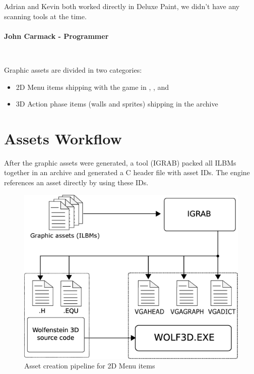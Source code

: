 \documentclass[book.tex]{subfiles}
\begin{document}
\begin{fancyquotes}
Adrian and Kevin both worked directly in Deluxe Paint, we didn't have any scanning tools at the time.\\
\\
\textbf{John Carmack - Programmer}
\end{fancyquotes}\\
\par
Graphic assets are divided in two categories:
\begin{itemize}
\item 2D Menu items shipping with the game in , , and 
\item 3D Action phase items (walls and sprites) shipping in the  archive
\end{itemize}


\section{Assets Workflow}
After the graphic assets were generated, a tool (IGRAB) packed all ILBMs together in an archive and generated a C header file with asset IDs. The engine references an asset directly by using these IDs.\\
\begin{figure}[H]
\centering
 \includegraphics[width=.9\textwidth]{imgs/drawings/drawing_plain.eps}
 \caption{Asset creation pipeline for 2D Menu items}
 \label{asset-creation-pipeline}
\end{figure}
\par
\begin{minipage}{\textwidth}
 \par
 \end{minipage}
 
\end{document}
